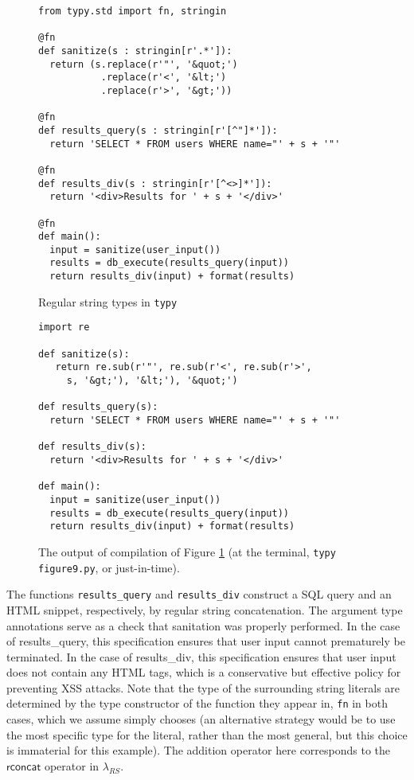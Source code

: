 \documentclass[10pt]{sigplanconf}
\theoremstyle{definition}
\begin{document}
\begin{figure}[t]\footnotesize\begin{lstlisting}
from typy.std import fn, stringin

@fn
def sanitize(s : stringin[r'.*']):
  return (s.replace(r'"', '&quot;') 
           .replace(r'<', '&lt;')
           .replace(r'>', '&gt;'))

@fn
def results_query(s : stringin[r'[^"]*']):
  return 'SELECT * FROM users WHERE name="' + s + '"'

@fn
def results_div(s : stringin[r'[^<>]*']):
  return '<div>Results for ' + s + '</div>'

@fn
def main():
  input = sanitize(user_input())
  results = db_execute(results_query(input))
  return results_div(input) + format(results)
\end{lstlisting}
\caption{Regular string types in {\tt typy}}\label{fig:atexample}
\end{figure}

\begin{figure}
\begin{lstlisting}
import re

def sanitize(s):
   return re.sub(r'"', re.sub(r'<', re.sub(r'>', 
     s, '&gt;'), '&lt;'), '&quot;')

def results_query(s): 
  return 'SELECT * FROM users WHERE name="' + s + '"'

def results_div(s):
  return '<div>Results for ' + s + '</div>'

def main():
  input = sanitize(user_input())
  results = db_execute(results_query(input))
  return results_div(input) + format(results)
\end{lstlisting}
\caption{The output of compilation of Figure \ref{fig:atexample} (at the terminal, \texttt{typy figure9.py}, or just-in-time).}
\label{fig:atexample-out}
\end{figure} 

The functions \verb|results_query| and \verb|results_div| construct a SQL query and an HTML snippet, respectively, by regular string concatenation. The argument type annotations serve as a check that sanitation was properly performed. In the case of \textsf{results_query}, this specification ensures that user input cannot prematurely be terminated. 
In the case of \textsf{results_div}, this specification ensures that user input does 
not contain any HTML tags, which is a conservative but effective policy for preventing XSS attacks. Note that the type of the surrounding string literals are determined by the type constructor of the function they appear in, \verb|fn| in both cases, which we assume simply chooses  (an alternative strategy would be to use the most specific type for the literal, rather than the most general, but this choice is immaterial for this example). The addition operator here corresponds to the $\textsf{rconcat}$ operator in $\lambda_{RS}$.
\end{document}
